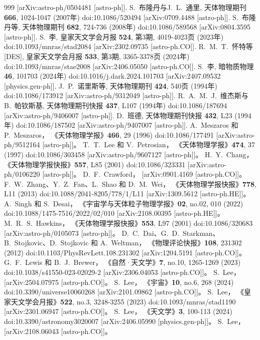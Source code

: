 \documentclass[jkps,preprint,fleqn]{revtex4}
\begin{document}
\begin{thebibliography}{999}
[arXiv:astro-ph/0504481 [astro-ph]].
S.~布隆丹与J.~L.~通里,
天体物理期刊 \textbf{666}, 1024-1047 (2007年)
doi:10.1086/520494
[arXiv:0709.4488 [astro-ph]].
S.~布隆丹等,
天体物理期刊 \textbf{682}, 724-736 (2008年)
doi:10.1086/589568
[arXiv:0804.3595 [astro-ph]].
S.~李,
皇家天文学会月报 \textbf{524}, 第3期, 4019-4023页 (2023年)
doi:10.1093/mnras/stad2084
[arXiv:2302.09735 [astro-ph.CO]].
R.~M.~T.~怀特等[DES],
皇家天文学会月报 \textbf{533}, 第3期, 3365-3378页 (2024年)
doi:10.1093/mnras/stae2008
[arXiv:2406.05050 [astro-ph.CO]].
S.~李,
暗物质物理 \textbf{46}, 101703 (2024年)
doi:10.1016/j.dark.2024.101703
[arXiv:2407.09532 [physics.gen-ph]].
J.~P.~诺里斯等,
天体物理期刊 \textbf{424}, 540页 (1994年)
doi:10.1086/173912
[arXiv:astro-ph/9312049 [astro-ph]].
R.~A.~M.~J.~维杰斯与B.~帕钦斯基,
天体物理期刊快报 \textbf{437}, L107 (1994年)
doi:10.1086/187694
[arXiv:astro-ph/9406007 [astro-ph]].
D.~班德,
天体物理期刊快报 \textbf{432}, L23 (1994年)
doi:10.1086/187502
[arXiv:astro-ph/9407007 [astro-ph]].
A.~Meszaros 和 P.~Meszaros，
《天体物理学报》\textbf{466}, 29 (1996)
doi:10.1086/177491
[arXiv:astro-ph/9512164 [astro-ph]]。
T.~T.~Lee 和 V.~Petrosian，
《天体物理学报》\textbf{474}, 37 (1997)
doi:10.1086/303458
[arXiv:astro-ph/9607127 [astro-ph]]。
H.~Y.~Chang，
《天体物理学报快报》\textbf{557}, L85 (2001)
doi:10.1086/323331
[arXiv:astro-ph/0106220 [astro-ph]]。
D.~F.~Crawford，
[arXiv:0901.4169 [astro-ph.CO]]。
F.~W.~Zhang、Y.~Z.~Fan、L.~Shao 和 D.~M.~Wei，
《天体物理学报快报》\textbf{778}, L11 (2013)
doi:10.1088/2041-8205/778/1/L11
[arXiv:1309.5612 [astro-ph.HE]]。
A.~Singh 和 S.~Desai，
《宇宙学与天体粒子物理学报》\textbf{02}, no.02, 010 (2022)
doi:10.1088/1475-7516/2022/02/010
[arXiv:2108.00395 [astro-ph.HE]]。
M.~R.~S.~Hawkins，
《天体物理学报快报》\textbf{553}, L97 (2001)
doi:10.1086/320683
[arXiv:astro-ph/0105073 [astro-ph]]。
D.~C.~Dai、G.~D.~Starkman、B.~Stojkovic、D.~Stojkovic 和 A.~Weltman，
《物理评论快报》\textbf{108}, 231302 (2012)
doi:10.1103/PhysRevLett.108.231302
[arXiv:1204.5191 [astro-ph.CO]]。
G.~F.~Lewis 和 B.~J.~Brewer，
《自然·天文学》\textbf{7}, no.10, 1265-1269 (2023)
doi:10.1038/s41550-023-02029-2
[arXiv:2306.04053 [astro-ph.CO]]。
S.~Lee，
[arXiv:2504.07975 [astro-ph.CO]]。
S.~Lee，
《宇宙》\textbf{10}, no.6, 268 (2024)
doi:10.3390/universe10060268
[arXiv:2101.09862 [astro-ph.CO]]。
S.~Lee，
《皇家天文学会月报》\textbf{522}, no.3, 3248-3255 (2023)
doi:10.1093/mnras/stad1190
[arXiv:2301.06947 [astro-ph.CO]]。
S.~Lee，
《天文学》\textbf{3}, 100-113 (2024)
doi:10.3390/astronomy3020007
[arXiv:2406.05990 [physics.gen-ph]]。
S.~Lee，
[arXiv:2108.06043 [astro-ph.CO]]。
\end{thebibliography}
\end{document}
